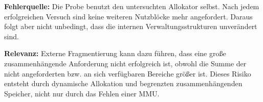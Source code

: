 \textbf{Fehlerquelle:} Die Probe benutzt den untersuchten Allokator selbst. Nach jedem erfolgreichen Versuch sind keine weiteren Nutzbl{\"o}cke mehr angefordert. Daraus folgt aber nicht unbedingt, dass die internen Verwaltungsstrukturen unver{\"a}ndert sind.

\textbf{Relevanz:} Externe Fragmentierung kann dazu f{\"u}hren, dass eine gro{\ss}e zusammenh{\"a}ngende Anforderung nicht erfolgreich ist, obwohl die Summe der nicht angeforderten bzw. an sich verf{\"u}gbaren Bereiche gr{\"o}{\ss}er ist. Dieses Risiko entsteht durch dynamische Allokation und begrenzten zusammenh{\"a}ngenden Speicher, nicht nur durch das Fehlen einer MMU.
